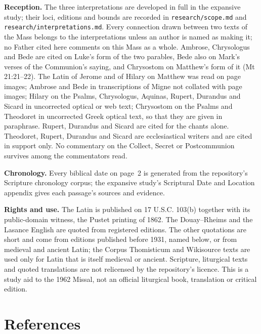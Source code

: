 {\textbf{Reception.} The three interpretations are developed in full in the
expansive study; their loci, editions and bounds are recorded in
\texttt{research/scope.md} and \texttt{research/interpretations.md}. Every
connection drawn between two texts of the Mass belongs to the interpretations
unless an author is named as making it; no Father cited here comments on this
Mass as a whole. Ambrose, Chrysologus and Bede are cited on Luke's form of the
two parables, Bede also on Mark's verses of the Communion's saying, and
Chrysostom on Matthew's form of it (Mt 21:21--22). The Latin of Jerome and of
Hilary on Matthew was read on page images; Ambrose and Bede in transcriptions
of Migne not collated with page images;
Hilary on the Psalms, Chrysologus, Aquinas, Rupert, Durandus and Sicard in
uncorrected optical or web text; Chrysostom on the Psalms and Theodoret in
uncorrected Greek optical text, so that they are given in paraphrase. Rupert,
Durandus and Sicard are cited for the chants alone. Theodoret, Rupert,
Durandus and Sicard are ecclesiastical writers and are cited in support only.
No commentary on the Collect, Secret or Postcommunion survives among the
commentators read.

\textbf{Chronology.} Every biblical date on page~2 is generated from the
repository's Scripture chronology corpus; the expansive study's Scriptural
Date and Location appendix gives each passage's sources and evidence.

\textbf{Rights and use.} The Latin is published on 17 U.S.C. 103(b) together
with its public-domain witness, the Pustet printing of 1862. The Douay--Rheims
and the Lasance English are quoted from registered editions. The other
quotations are short and come from editions published before 1931, named
below, or from medieval and ancient Latin; the Corpus Thomisticum and
Wikisource texts are used only for Latin that is itself medieval or ancient.
Scripture, liturgical texts and quoted translations are not relicensed by the
repository's licence. This is a study aid to the 1962 Missal, not an official
liturgical book, translation or critical edition.
\par}

\section{References}

